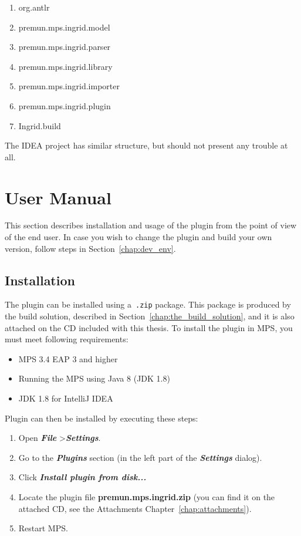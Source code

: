 \begin{enumerate}
	\item org.antlr
	\item premun.mps.ingrid.model
	\item premun.mps.ingrid.parser
	\item premun.mps.ingrid.library
	\item premun.mps.ingrid.importer
	\item premun.mps.ingrid.plugin
	\item Ingrid.build
\end{enumerate}

The IDEA project has similar structure, but should not present any trouble at all.

\section{User Manual}

This section describes installation and usage of the plugin from the point of view of the end user.
In case you wish to change the plugin and build your own version, follow steps in Section~\ref{chap:dev_env}.

\subsection{Installation}

The plugin can be installed using a~\texttt{.zip} package.
This package is produced by the build solution, described in Section~\ref{chap:the_build_solution}, and it is also attached on the CD included with this thesis.
To install the plugin in MPS, you must meet following requirements:

\begin{itemize}
	\item MPS 3.4 EAP 3 and higher
	\item Running the MPS using Java 8 (JDK 1.8)
	\item JDK 1.8 for IntelliJ IDEA
\end{itemize}

\noindent
Plugin can then be installed by executing these steps:

\begin{enumerate}
	\item Open \textbf{\textit{File}} \textgreater \textbf{\textit{Settings}}.
	\item Go to the \textbf{\textit{Plugins}} section (in the left part of the \textbf{\textit{Settings}} dialog).
	\item Click \textbf{\textit{Install plugin from disk...}}
	\item Locate the plugin file \textbf{premun.mps.ingrid.zip} (you can find it on the attached CD, see the Attachments Chapter~\ref{chap:attachments}).
	\item Restart MPS.
\end{enumerate}

